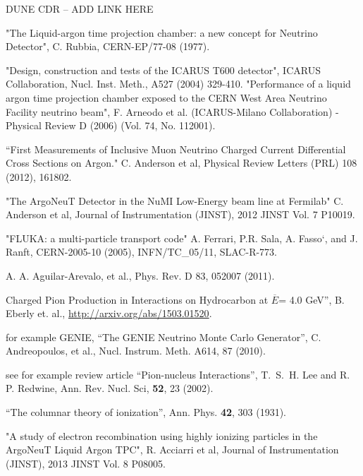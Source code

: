 \begin{thebibliography}{99}

%
%

%
%

 DUNE CDR -- ADD LINK HERE

"The Liquid-argon time projection chamber: a new concept for Neutrino Detector", C. Rubbia, CERN-EP/77-08 (1977).

 "Design, construction and tests of the ICARUS T600 detector", ICARUS Collaboration, Nucl. Inst. Meth., A527 (2004) 329-410. 
"Performance of a liquid argon time projection chamber exposed to the CERN West Area Neutrino Facility neutrino beam", F. Arneodo et al. (ICARUS-Milano Collaboration) - Physical Review D (2006) (Vol. 74, No. 112001). 

 ``First Measurements of Inclusive Muon Neutrino Charged Current Differential Cross Sections on Argon." C. Anderson et al, Physical Review Letters (PRL) 108 (2012), 161802. 

 "The ArgoNeuT Detector in the NuMI Low-Energy beam line at Fermilab" C. Anderson et al, Journal of Instrumentation (JINST), 2012 JINST Vol. 7 P10019. 

 "FLUKA: a multi-particle transport code" A. Ferrari, P.R. Sala, A. Fasso`, and J. Ranft, CERN-2005-10 (2005), INFN/TC\_05/11, SLAC-R-773.

  A. A. Aguilar-Arevalo, et al.,
Phys. Rev. D 83, 052007 (2011).

 Charged Pion Production in Interactions on Hydrocarbon 
at $\overline{E}$= 4.0 GeV'', B. Eberly et. al., \url{http://arxiv.org/abs/1503.01520}.

 for example GENIE, ``The GENIE Neutrino Monte Carlo Generator'', C. Andreopoulos, et al., Nucl. Instrum. Meth. A614, 87 (2010).

 see for example review article ``Pion-nucleus Interactions'',
T.~S.~H. Lee and R. P. Redwine, Ann. Rev. Nucl. Sci,  {\bf 52}, 23 (2002).

 ``The columnar theory of ionization'', Ann. Phys. {\bf 42}, 303 (1931).

 "A study of electron recombination using highly ionizing particles in the ArgoNeuT Liquid Argon TPC", 
R. Acciarri et al, Journal of Instrumentation 
(JINST), 2013 JINST Vol. 8 P08005.


\end{thebibliography}
